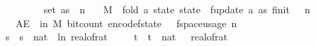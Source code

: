 \begin{isabellebody}
\ \ \ {\isachardoublequoteopen}{\isasymdelta}\ {\isasymin}\ {\isacharbraceleft}{\kern0pt}{}{\isacharless}{\kern0pt}{\isachardot}{\kern0pt}{\isachardot}{\kern0pt}{\isacharless}{\kern0pt}{}{\isacharbraceright}{\kern0pt}{\isachardoublequoteclose}\isanewline
\ \ \ {\isachardoublequoteopen}set\ as\ {\isasymsubseteq}\ {\isacharbraceleft}{\kern0pt}{}{\isachardot}{\kern0pt}{\isachardot}{\kern0pt}{\isacharless}{\kern0pt}n{\isacharbraceright}{\kern0pt}{\isachardoublequoteclose}\isanewline
\ \ \ {\isachardoublequoteopen}M\ {\isasymequiv}\ fold\ {\isacharparenleft}{\kern0pt}{\isasymlambda}a\ state{\isachardot}{\kern0pt}\ state\ {\isasymbind}\ f{}{\isacharunderscore}{\kern0pt}update\ a{\isacharparenright}{\kern0pt}\ as\ {\isacharparenleft}{\kern0pt}f{}{\isacharunderscore}{\kern0pt}init\ {\isasymdelta}\ {\isasymepsilon}\ n{\isacharparenright}{\kern0pt}{\isachardoublequoteclose}\isanewline
\ \ \ {\isachardoublequoteopen}AE\ {\isasymomega}\ in\ M{\isachardot}{\kern0pt}\ bit{\isacharunderscore}{\kern0pt}count\ {\isacharparenleft}{\kern0pt}encode{\isacharunderscore}{\kern0pt}f{}{\isacharunderscore}{\kern0pt}state\ {\isasymomega}{\isacharparenright}{\kern0pt}\ {\isasymle}\ f{}{\isacharunderscore}{\kern0pt}space{\isacharunderscore}{\kern0pt}usage\ {\isacharparenleft}{\kern0pt}n{\isacharcomma}{\kern0pt}\ {\isasymepsilon}{\isacharcomma}{\kern0pt}\ {\isasymdelta}{\isacharparenright}{\kern0pt}{\isachardoublequoteclose}\isanewline
%
\isadelimproof
%
\endisadelimproof
%
\isatagproof
{}\isamarkupfalse%
\ {\isacharminus}{\kern0pt}\isanewline
\ \ \isamarkupfalse%
\ s\ \ {\isachardoublequoteopen}s\ {\isacharequal}{\kern0pt}\ nat\ {\isasymlceil}{\isacharminus}{\kern0pt}{\isacharparenleft}{\kern0pt}{}{}{\isacharasterisk}{\kern0pt}\ ln\ {\isacharparenleft}{\kern0pt}real{\isacharunderscore}{\kern0pt}of{\isacharunderscore}{\kern0pt}rat\ {\isasymepsilon}{\isacharparenright}{\kern0pt}{\isacharparenright}{\kern0pt}{\isasymrceil}{\isachardoublequoteclose}\isanewline
\ \ \isamarkupfalse%
\ t\ \ {\isachardoublequoteopen}t\ {\isacharequal}{\kern0pt}\ nat\ {\isasymlceil}{}{}\ {\isacharslash}{\kern0pt}\ {\isacharparenleft}{\kern0pt}real{\isacharunderscore}{\kern0pt}of{\isacharunderscore}{\kern0pt}rat\ {\isasymdelta}{\isacharparenright}{\kern0pt}\isanewline

\end{isabellebody}
